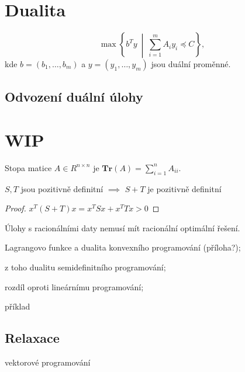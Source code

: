 \section{Dualita}

$$
    \max \left\{ b^Ty \ \middle|\ \sum_{i=1}^m A_i y_i \preceq C \right\},
$$
kde $b = (b_1, \dots, b_m)$ a $y = (y_1, \dots, y_m)$ jsou duální proměnné.

\subsection*{Odvození duální úlohy}

\section*{WIP}

Stopa matice $A \in R^{n \times n}$ je $\textbf{Tr}(A) = \sum_{i=1}^n A_{ii}$.

\begin{vt}
$S, T$ jsou pozitivně definitní $\implies$ $S + T$ je pozitivně definitní
\end{vt}

\begin{proof}
$x^T (S+T) x = x^T S x + x^T T x > 0$
\end{proof}


Úlohy s racionálními daty nemusí mít racionální optimální řešení.


\noindent Lagrangovo funkce a dualita konvexního programování (příloha?);

\noindent z toho dualitu semidefinitního programování;

\noindent rozdíl oproti lineárnímu programování;

\noindent příklad

\subsection*{Relaxace}
\noindent vektorové programování

